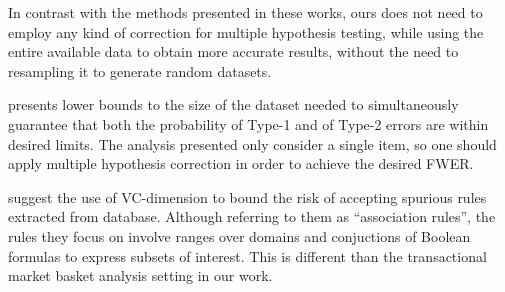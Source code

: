In contrast with the methods presented in these works,
ours does not need to employ any kind of correction for multiple hypothesis
testing, while using the entire available data to obtain more accurate results,
without the need to resampling it to generate random datasets.  

\citet{JacquemontFS09} presents lower bounds to the size of the
dataset needed to simultaneously guarantee that both the probability of Type-1
and of Type-2 errors are within desired limits. The analysis presented only
consider a single item, so one should apply multiple hypothesis correction in
order to achieve the desired FWER.

\iffalse
{\bf XXX:} To me, this paper
looks flawed because they do derive all the bounds for a single pattern and do
not apply a union bound at the end, which seems necessary to me. They do not
even try to argue that it is not needed, so I guess they overlooked this\ldots
\fi

\citet{TeytaudL01} suggest the use of VC-dimension to bound the risk of
accepting spurious rules extracted from database. Although referring to them as
``association rules'', the rules they focus on involve ranges over domains and
conjuctions of Boolean formulas to express subsets of interest. This is
different than the transactional market basket analysis setting in our work.

\iffalse
{\bf XXX:} Honestly, this paper is terrible. Nothing is explained, definitions
are sloppy or absent, a bound to a VC-dimension of something is thrown in there
without explaination\ldots \emph{Your paper is bad and you should feel bad!}
\fi

